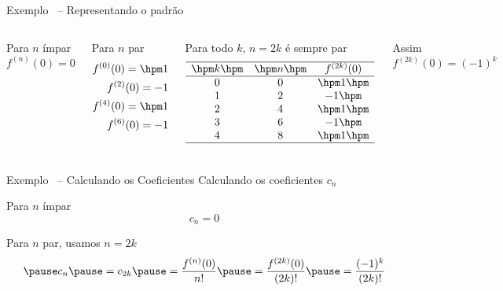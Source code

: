 \begin{frame}{Exemplo \theexemplo\ -- Representando o padrão}
\begin{columns}
  Para $n$ ímpar
  \[
    f^{(n)}(0) = 0
  \]

  \pause
  Para $n$ par
  \begin{align*}
    f^{(0)}(0) = \hpm 1  \\
    f^{(2)}(0) =     -1  \\
    f^{(4)}(0) = \hpm 1  \\
    f^{(6)}(0) =     -1
  \end{align*}

  \pause
  Para todo $k$, \(n=2k\) é sempre par
  \[
    \begin{array}{ccc}
      \hline
      \hpm k \hpm & \hpm n \hpm & f^{(2k)}(0) \\ \hline
      0           & 0           & \hpm 1 \hpm \\
      1           & 2           &     -1 \hpm \\
      2           & 4           & \hpm 1 \hpm \\
      3           & 6           &     -1 \hpm \\
      4           & 8           & \hpm 1 \hpm \\ \hline
    \end{array}
  \]

  \pause
  Assim
  \(
    f^{(2k)}(0) = (-1)^k
  \)
\end{columns}
\end{frame}

\begin{frame}{Exemplo \theexemplo\ -- Calculando os Coeficientes}
  Calculando os coeficientes $c_n$

  \pause
  Para $n$ ímpar
  \[
    c_n = 0
  \]

  \pause
  Para $n$ par, usamos $n=2k$
  \[
    \pause
    c_n
    \pause
    = c_{2k}
    \pause
    = \frac{f^{(n)}(0)}{n!}
    \pause
    = \frac{f^{(2k)}(0)}{(2k)!}
    \pause
    = \frac{(-1)^k}{(2k)!}
  \]
\end{frame}

